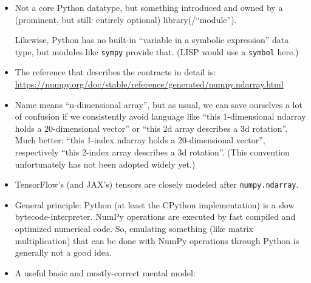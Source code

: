 \documentclass[11pt]{article}
\begin{document}
\begin{itemize}
  \begin{itemize}
  \item
    Not a core Python datatype, but something introduced and owned by a
    (prominent, but still: entirely optional) library(/``module'').

    Likewise, Python has no built-in ``variable in a symbolic
    expression'' data type, but modules like \texttt{sympy} provide
    that. (LISP would use a \texttt{symbol} here.)
  \item
    The reference that describes the contracts in detail is:
    \url{https://numpy.org/doc/stable/reference/generated/numpy.ndarray.html}
  \item
    Name means ``n-dimensional array'', but as usual, we can save
    ourselves a lot of confusion if we consistently avoid language like
    ``this 1-dimensional ndarray holds a 20-dimensional vector'' or
    ``this 2d array describes a 3d rotation''. Much better: ``this
    1-index ndarray holds a 20-dimensional vector'', respectively ``this
    2-index array describes a 3d rotation''. (This convention
    unfortunately has not been adopted widely yet.)
  \item
    TensorFlow's (and JAX's) tensors are closely modeled after
    \texttt{numpy.ndarray}.
  \item
    General principle: Python (at least the CPython implementation) is a
    slow bytecode-interpreter. NumPy operations are executed by fast
    compiled and optimized numerical code. So, emulating something (like
    matrix multiplication) that can be done with NumPy operations
    through Python is generally not a good idea.
  \item
    A useful basic and mostly-correct mental model:


\end{itemize}
\end{itemize}
\end{document}
